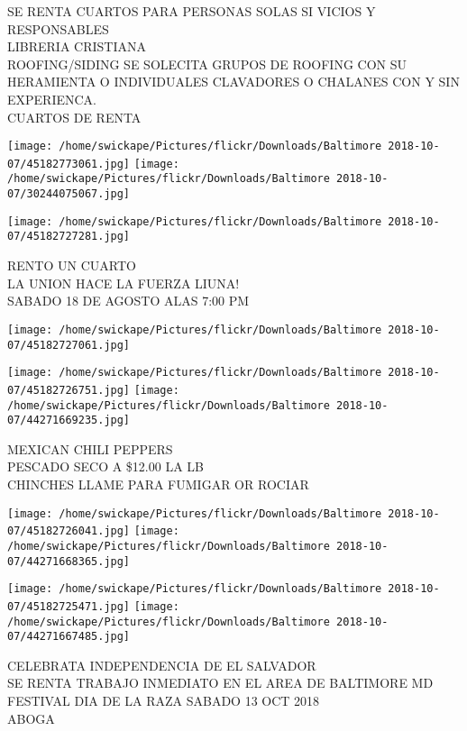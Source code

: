 \documentclass[10pt,letterpaper]{article}
\begin{document}
SE RENTA CUARTOS PARA PERSONAS SOLAS SI VICIOS Y RESPONSABLES\\
LIBRERIA CRISTIANA\\
ROOFING/SIDING SE SOLECITA GRUPOS DE ROOFING CON SU HERAMIENTA O INDIVIDUALES CLAVADORES O CHALANES CON Y SIN EXPERIENCA.\\
CUARTOS DE RENTA\\
\pagebreak

\texttt{[image: /home/swickape/Pictures/flickr/Downloads/Baltimore 2018-10-07/45182773061.jpg]}
\texttt{[image: /home/swickape/Pictures/flickr/Downloads/Baltimore 2018-10-07/30244075067.jpg]}

\texttt{[image: /home/swickape/Pictures/flickr/Downloads/Baltimore 2018-10-07/45182727281.jpg]}

RENTO UN CUARTO\\
LA UNION HACE LA FUERZA LIUNA!\\
SABADO 18 DE AGOSTO ALAS 7:00 PM\\
\pagebreak

\texttt{[image: /home/swickape/Pictures/flickr/Downloads/Baltimore 2018-10-07/45182727061.jpg]}

\vspace{0.25in}
\texttt{[image: /home/swickape/Pictures/flickr/Downloads/Baltimore 2018-10-07/45182726751.jpg]}
\texttt{[image: /home/swickape/Pictures/flickr/Downloads/Baltimore 2018-10-07/44271669235.jpg]}

MEXICAN CHILI PEPPERS\\
PESCADO SECO A \$12.00 LA LB\\
CHINCHES LLAME PARA FUMIGAR OR ROCIAR\\
\pagebreak

\texttt{[image: /home/swickape/Pictures/flickr/Downloads/Baltimore 2018-10-07/45182726041.jpg]}
\texttt{[image: /home/swickape/Pictures/flickr/Downloads/Baltimore 2018-10-07/44271668365.jpg]}

\texttt{[image: /home/swickape/Pictures/flickr/Downloads/Baltimore 2018-10-07/45182725471.jpg]}
\texttt{[image: /home/swickape/Pictures/flickr/Downloads/Baltimore 2018-10-07/44271667485.jpg]}

CELEBRATA INDEPENDENCIA DE EL SALVADOR\\
SE RENTA TRABAJO INMEDIATO EN EL AREA DE BALTIMORE MD\\
FESTIVAL DIA DE LA RAZA SABADO 13 OCT 2018\\
ABOGA\\
\pagebreak
\end{document}

